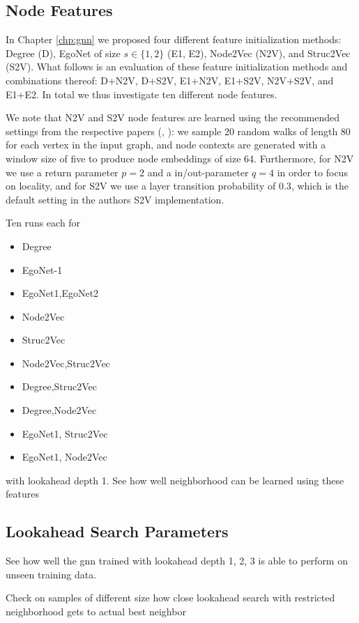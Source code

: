\documentclass[draft,final]{vutinfth} %
\begin{document}
\subsection{Node Features}
In Chapter \ref{chp:gnn} we proposed four different feature initialization methods: Degree (D), EgoNet of size $s \in \{1,2\}$ (E1, E2), Node2Vec (N2V), and Struc2Vec (S2V). What follows is an evaluation of these feature initialization methods and combinations thereof: D+N2V, D+S2V, E1+N2V, E1+S2V, N2V+S2V, and E1+E2. In total we thus investigate ten different node features.

We note that N2V and S2V node features are learned using the recommended settings from the respective papers (\cite{GroverL16}, \cite{FigueiredoRS17}): we sample 20 random walks of length 80 for each vertex in the input graph, and node contexts are generated with a window size of five to produce node embeddings of size 64. Furthermore, for N2V we use a return parameter $p=2$ and a in/out-parameter $q=4$ in order to focus on locality, and for S2V we use a layer transition probability of $0.3$, which is the default setting in the authors S2V implementation. 



Ten runs each for
\begin{itemize}
    \item Degree
    \item EgoNet-1
    \item EgoNet1,EgoNet2
    \item Node2Vec
    \item Struc2Vec
    \item Node2Vec,Struc2Vec
    \item Degree,Struc2Vec
    \item Degree,Node2Vec
    \item EgoNet1, Struc2Vec
    \item EgoNet1, Node2Vec
\end{itemize}
with lookahead depth 1. See how well neighborhood can be learned using these features

\subsection{Lookahead Search Parameters}
See how well the gnn trained with lookahead depth 1, 2, 3 is able to perform on unseen training data. 

Check on samples of different size how close lookahead search with restricted neighborhood gets to actual best neighbor 
\end{document}
